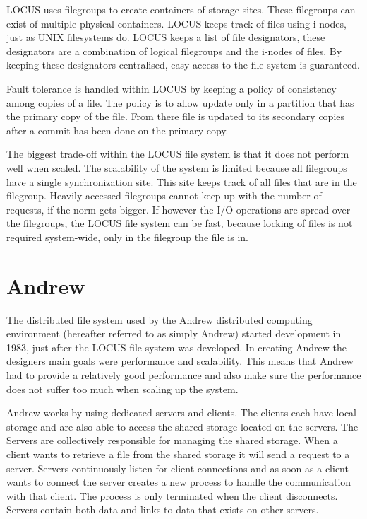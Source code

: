 \documentclass[a4paper,12px]{article}
\begin{document}
LOCUS uses filegroups to create containers of storage sites. These filegroups
can exist of multiple physical containers. LOCUS keeps track of files using
i-nodes, just as UNIX filesystems do. LOCUS keeps a list of file designators,
these designators are a combination of logical filegroups and the i-nodes of
files. \citet{concepts} By keeping these designators centralised, easy access to
the file system is guaranteed.

Fault tolerance is handled within LOCUS by keeping a policy of consistency among
copies of a file. The policy is to allow update only in a partition that has the
primary copy of the file. From there file is updated to its secondary copies
after a commit has been done on the primary copy.

The biggest trade-off within the LOCUS file system is that it does not perform
well when scaled. The scalability of the system is limited because all
filegroups have a single synchronization site. \citet{concepts} This site keeps
track of all files that are in the filegroup. Heavily accessed filegroups cannot
keep up with the number of requests, if the norm gets bigger. If however the I/O
operations are spread over the filegroups, the LOCUS file system can be fast,
because locking of files is not required system-wide, only in the filegroup the
file is in.

\section{Andrew}

The distributed file system used by the Andrew distributed computing environment
(hereafter referred to as simply Andrew) started development in 1983, just after
the LOCUS file system was developed. In creating Andrew the designers main goals
were performance and scalability. This means that Andrew had to provide a
relatively good performance and also make sure the performance does not suffer
too much when scaling up the system.\citet{andrew}

Andrew works by using dedicated servers and clients. The clients each have local
storage and are also able to access the shared storage located on the servers.
The Servers are collectively responsible for managing the shared
storage. \citet{concepts} When a client wants to retrieve a file from the shared
storage it will send a request to a server. Servers continuously listen for
client connections and as soon as a client wants to connect the server creates a
new process to handle the communication with that client. The process is only
terminated when the client disconnects. \citet{andrew} Servers contain both data
and links to data that exists on other servers.
\end{document}
